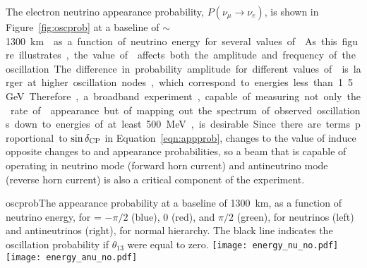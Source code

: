 The electron neutrino appearance probability, $P(\nu_\mu \rightarrow \nu_e)$, 
is shown in 
Figure~\ref{fig:oscprob} 
at a baseline of $\sim$\SI{1300}\km{} as a function of neutrino 
energy for several values of \deltacp. As this figure illustrates, the value 
of \deltacp affects both the amplitude and frequency of
the oscillation. The difference in probability amplitude
for different values of \deltacp is larger at higher oscillation nodes, which 
correspond to energies less than 1.5~GeV. Therefore, a broadband experiment, 
capable of measuring not only the rate of \nue appearance but of mapping out the 
spectrum of observed oscillations down to energies of at least 500~MeV, 
is desirable. Since there are terms proportional to $\sin\mdeltacp$ in Equation~\ref{eqn:appprob},
changes to the value of \deltacp induce opposite changes to \nue and
\anue appearance probabilities, so a beam that is capable of operating in
neutrino mode (forward horn current) and antineutrino mode (reverse horn current)
is also a critical component of the experiment.

\begin{cdrfigure}{oscprob}{The appearance probability at a baseline of 1300~km,
  as a function of neutrino energy, for \deltacp = $-\pi/2$ (blue), 
  0 (red), and $\pi/2$ (green), for neutrinos (left) and antineutrinos
  (right), for normal hierarchy. The black line indicates the oscillation
  probability if $\theta_{13}$ were equal to zero.}
\texttt{[image: energy\_nu\_no.pdf]}
\texttt{[image: energy\_anu\_no.pdf]}
\end{cdrfigure}

